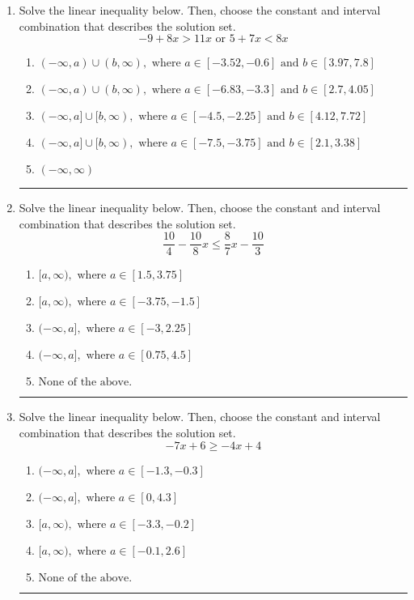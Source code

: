 \documentclass[14pt]{extbook}
\newcommand{\litem}[1]{\item#1\hspace*{-1cm}\rule{\textwidth}{0.4pt}}
\begin{document}
\begin{enumerate}
{\begin{enumerate}[label=\Alph*.]
\end{enumerate} }
\litem{
Solve the linear inequality below. Then, choose the constant and interval combination that describes the solution set.\[ -9 + 8 x > 11 x \text{ or } 5 + 7 x < 8 x \]\begin{enumerate}[label=\Alph*.]
\item \( (-\infty, a) \cup (b, \infty), \text{ where } a \in [-3.52, -0.6] \text{ and } b \in [3.97, 7.8] \)
\item \( (-\infty, a) \cup (b, \infty), \text{ where } a \in [-6.83, -3.3] \text{ and } b \in [2.7, 4.05] \)
\item \( (-\infty, a] \cup [b, \infty), \text{ where } a \in [-4.5, -2.25] \text{ and } b \in [4.12, 7.72] \)
\item \( (-\infty, a] \cup [b, \infty), \text{ where } a \in [-7.5, -3.75] \text{ and } b \in [2.1, 3.38] \)
\item \( (-\infty, \infty) \)

\end{enumerate} }
\litem{
Solve the linear inequality below. Then, choose the constant and interval combination that describes the solution set.\[ \frac{10}{4} - \frac{10}{8} x \leq \frac{8}{7} x - \frac{10}{3} \]\begin{enumerate}[label=\Alph*.]
\item \( [a, \infty), \text{ where } a \in [1.5, 3.75] \)
\item \( [a, \infty), \text{ where } a \in [-3.75, -1.5] \)
\item \( (-\infty, a], \text{ where } a \in [-3, 2.25] \)
\item \( (-\infty, a], \text{ where } a \in [0.75, 4.5] \)
\item \( \text{None of the above}. \)

\end{enumerate} }
\litem{
Solve the linear inequality below. Then, choose the constant and interval combination that describes the solution set.\[ -7x + 6 \geq -4x + 4 \]\begin{enumerate}[label=\Alph*.]
\item \( (-\infty, a], \text{ where } a \in [-1.3, -0.3] \)
\item \( (-\infty, a], \text{ where } a \in [0, 4.3] \)
\item \( [a, \infty), \text{ where } a \in [-3.3, -0.2] \)
\item \( [a, \infty), \text{ where } a \in [-0.1, 2.6] \)
\item \( \text{None of the above}. \)


\end{enumerate}}
\end{enumerate}
\end{document}

